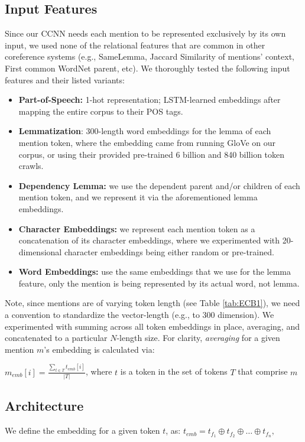 \documentclass[11pt,a4paper]{article}
\begin{document}
\subsection{Input Features}
\label{sec:features}
Since our CCNN needs each mention to be represented exclusively by its own input, we used none of the relational features that are common in other coreference systems (e.g., SameLemma, Jaccard Similarity of mentions' context, First common WordNet parent, etc).  We thoroughly tested the following input features and their listed variants:
\begin{itemize}
  \item \textbf{Part-of-Speech:} 1-hot representation; LSTM-learned embeddings after mapping the entire corpus to their POS tags.
  \item \textbf{Lemmatization}: 300-length word embeddings for the lemma of each mention token, where the embedding came from running GloVe \cite{pennington2014glove} on our corpus, or using their provided pre-trained 6 billion and 840 billion token crawls.
  \item \textbf{Dependency Lemma:} we use the dependent parent and/or children of each mention token, and we represent it via the aforementioned lemma embeddings.
  \item \textbf{Character Embeddings:} we represent each mention token as a concatenation of its character embeddings, where we experimented with 20-dimensional character embeddings being either random or pre-trained.
  \item \textbf{Word Embeddings:} use the same embeddings that we use for the lemma feature, only the mention is being represented by its actual word, not lemma.
\end{itemize}
Note, since mentions are of varying token length (see Table \ref{tab:ECB1}), we need a convention to standardize the vector-length (e.g., to 300 dimension).  We experimented with summing across all token embeddings in place, averaging, and concatenated to a particular $N$-length size.  For clarity, \textit{averaging} for a given mention $m$'s embedding is calculated via:

$m_{emb}[i] = \frac{\sum_{t \in T}t_{emb}[i]}{|T|}$, where $t$ is a token in the set of tokens $T$ that comprise $m$

\subsection{Architecture}
We define the embedding for a given token $t$, as: $t_{emb} = t_{f_{1}} \oplus t_{f_{2}} \oplus \ldots \oplus t_{f_{n}},$
\end{document}
